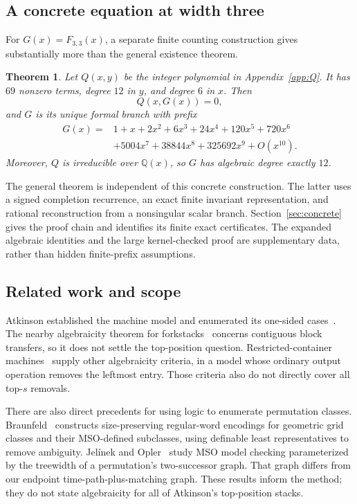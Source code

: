 \documentclass[11pt]{article}
\newtheorem{theorem}{Theorem}[section]
\theoremstyle{definition}\newtheorem{definition}[theorem]{Definition}
\theoremstyle{remark}\newtheorem{remark}[theorem]{Remark}
\newcommand{\Q}{\mathbb Q}
\begin{document}
\subsection{A concrete equation at width three}
For $G(x)=F_{3,3}(x)$, a separate finite counting construction gives substantially more than the general existence theorem.
\begin{theorem}\label{thm:concrete}
Let $Q(x,y)$ be the integer polynomial in Appendix~\ref{app:Q}. It has $69$ nonzero terms, degree $12$ in $y$, and degree $6$ in $x$. Then
\[
 Q(x,G(x))=0,
\]
and $G$ is its unique formal branch with prefix
\begin{align*}
G(x)={}&1+x+2x^2+6x^3+24x^4+120x^5+720x^6\\
 &+5004x^7+38844x^8+325692x^9+O(x^{10}).
\end{align*}
Moreover, $Q$ is irreducible over $\Q(x)$, so $G$ has algebraic degree exactly $12$.
\end{theorem}
The general theorem is independent of this concrete construction. The latter uses a signed completion recurrence, an exact finite invariant representation, and rational reconstruction from a nonsingular scalar branch. Section~\ref{sec:concrete} gives the proof chain and identifies its finite exact certificates. The expanded algebraic identities and the large kernel-checked proof are supplementary data, rather than hidden finite-prefix assumptions.

\subsection{Related work and scope}
Atkinson established the machine model and enumerated its one-sided cases~\cite{Atkinson1998}. The nearby algebraicity theorem for forkstacks~\cite{AlbertAtkinson2003} concerns contiguous block transfers, so it does not settle the top-position question. Restricted-container machines~\cite{RestrictedContainers2018} supply other algebraicity criteria, in a model whose ordinary output operation removes the leftmost entry. Those criteria also do not directly cover all top-$s$ removals.

There are also direct precedents for using logic to enumerate permutation classes. Braunfeld~\cite[Section 4 and Theorem 5.2]{Braunfeld2025} constructs size-preserving regular-word encodings for geometric grid classes and their MSO-defined subclasses, using definable least representatives to remove ambiguity. Jel\'inek and Opler~\cite[Theorem 4.1]{JelinekOpler2025} study MSO model checking parameterized by the treewidth of a permutation's two-successor graph. That graph differs from our endpoint time-path-plus-matching graph. These results inform the method; they do not state algebraicity for all of Atkinson's top-position stacks.
\end{document}
